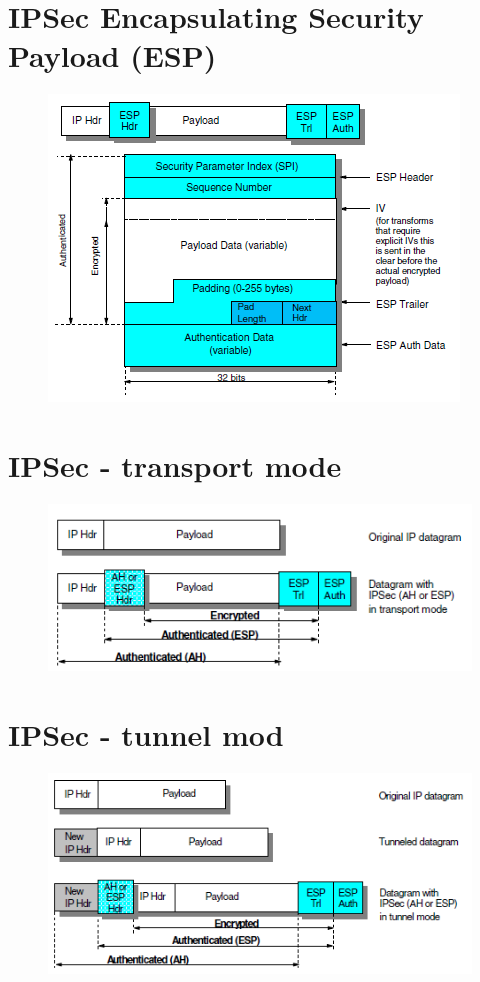 \documentclass[10pt,a4paper]{article}
\begin{document}
\section{IPSec Encapsulating Security Payload (ESP)}

\begin{figure}[hbtp]
\centering
\includegraphics[scale=1]{IPSec Encapsulating Security Payload (ESP).png}
\end{figure}
\newpage
\section{IPSec - transport mode}

\begin{figure}[hbtp]
\centering
\includegraphics[scale=1]{IPSec - transport mode.png}
\end{figure}
\newpage
\section{IPSec - tunnel mod}

\begin{figure}[hbtp]
\centering
\includegraphics[scale=1]{IPSec - tunnel mode.png}
\end{figure}
\newpage
\end{document}
